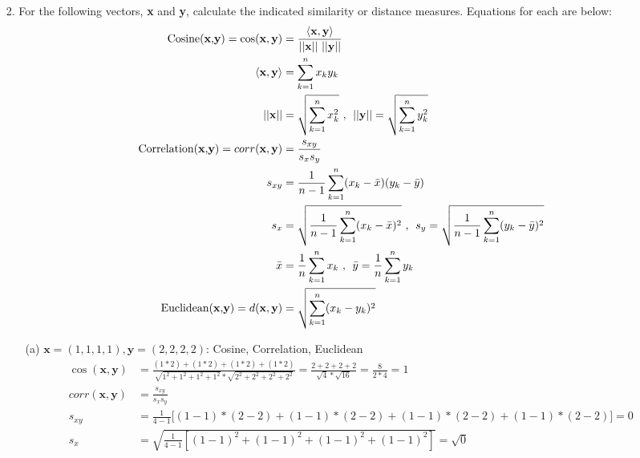 \documentclass{article}
\begin{document}
\begin{itemize}
    \item[2.] For the following vectors, \textbf{x} and \textbf{y}, calculate the indicated similarity or distance measures. Equations for each are below:\\
        \begin{align}
            \text{Cosine(\textbf{x},\textbf{y})}=\cos(\textbf{x},\textbf{y})&=\frac{\langle \textbf{x},\textbf{y}\rangle}{||\textbf{x}|| \text{ } ||\textbf{y}||}\nonumber\\
            \langle \textbf{x},\textbf{y}\rangle&=\sum_{k=1}^n x_ky_k\nonumber\\
            ||\textbf{x}||&=\sqrt{\sum_{k=1}^n x_k^2}\text{ , }\hspace{0.1cm}||\textbf{y}||=\sqrt{\sum_{k=1}^n y_k^2}\nonumber\\
            \text{Correlation(\textbf{x},\textbf{y})}=corr(\textbf{x},\textbf{y})&=\frac{s_{xy}}{s_xs_y}\nonumber\\
            s_{xy}&=\frac{1}{n-1}\sum_{k=1}^n (x_k-\bar{x})(y_k-\bar{y})\nonumber\\
            s_x&=\sqrt{\frac{1}{n-1}\sum_{k=1}^n (x_k-\bar{x})^2}\text{ , }\hspace{0.1cm}s_y=\sqrt{\frac{1}{n-1}\sum_{k=1}^n (y_k-\bar{y})^2}\nonumber\\
            \bar{x}&=\frac{1}{n}\sum_{k=1}^n x_k\text{ , }\hspace{0.1cm}\bar{y}=\frac{1}{n}\sum_{k=1}^n y_k\nonumber\\
            \text{Euclidean(\textbf{x},\textbf{y})}=d(\textbf{x},\textbf{y})&=\sqrt{\sum_{k=1}^n (x_k-y_k)^2}\nonumber
        \end{align}
    \begin{itemize}
        \item[(a)] $\textbf{x}=(1,1,1,1), \textbf{y}=(2,2,2,2)$: Cosine, Correlation, Euclidean
        \begin{align}
            \cos(\textbf{x},\textbf{y})&=\frac{(1*2)+(1*2)+(1*2)+(1*2)}{\sqrt{1^2+1^2+1^2+1^2}*\sqrt{2^2+2^2+2^2+2^2}}=\frac{2+2+2+2}{\sqrt{4}*\sqrt{16}}=\frac{8}{2*4}=1\nonumber\\
            corr(\textbf{x},\textbf{y})&=\frac{s_{xy}}{s_xs_y}\nonumber\\
            s_{xy}&=\frac{1}{4-1}\Big[(1-1)*(2-2)+(1-1)*(2-2)+(1-1)*(2-2)+(1-1)*(2-2)\Big]=0\nonumber\\
            s_x&=\sqrt{\frac{1}{4-1} [(1-1)^2+(1-1)^2+(1-1)^2+(1-1)^2]}=\sqrt{0}\nonumber\\

\end{align}
\end{itemize}
\end{itemize}
\end{document}
